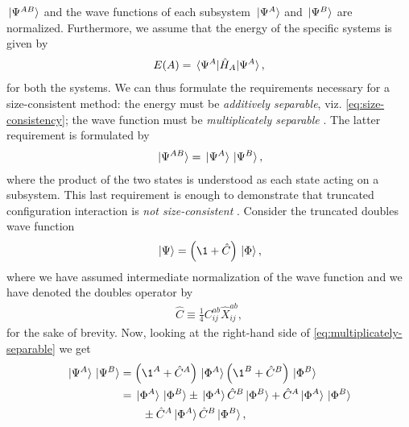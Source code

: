             $\ket*{\Psi^{AB}}$ and the wave functions of each subsystem
            $\ket*{\Psi^{A}}$ and $\ket*{\Psi^{B}}$ are normalized.
            Furthermore, we assume that the energy of the specific systems is
            given by
            \begin{align}
                E(A) = \mel*{\Psi^{A}}{\hat{H}_{A}}{\Psi^{A}},
            \end{align}
            for both the systems.
            We can thus formulate the requirements necessary for a
            size-consistent method: the energy must be \emph{additively
            separable}, viz. \autoref{eq:size-consistency}; the wave function
            must be \emph{multiplicately separable} \cite{helgaker-molecular}.
            The latter requirement is formulated by
            \begin{align}
                \ket*{\Psi^{AB}}
                = \ket*{\Psi^{A}}\ket*{\Psi^{B}},
                \label{eq:multiplicately-separable}
            \end{align}
            where the product of the two states is understood as each state
            acting on a subsystem.
            This last requirement is enough to demonstrate that truncated
            configuration interaction is \emph{not size-consistent}
            \cite{helgaker-molecular}.
            Consider the truncated doubles wave function
            \begin{align}
                \ket*{\Psi} = \para{\1 + \hat{C}}\ket*{\slat},
            \end{align}
            where we have assumed intermediate normalization of the wave function
            and we have denoted the doubles operator by
            \begin{align}
                \hat{C} \equiv \frac{1}{4}C^{ab}_{ij}\hat{X}^{ab}_{ij},
            \end{align}
            for the sake of brevity.
            Now, looking at the right-hand side of
            \autoref{eq:multiplicately-separable} we get
            \begin{align}
                \ket*{\Psi^{A}}\ket*{\Psi^{B}}
                &= \para{\1^{A} + \hat{C}^{A}}\ket*{\slat^A}
                \para{\1^{B} + \hat{C}^{B}}\ket*{\slat^B}
                \\
                &=
                \ket*{\slat^{A}}\ket*{\slat^{B}}
                \pm \ket*{\slat^{A}}\hat{C}^{B}\ket*{\slat^{B}}
                + \hat{C}^{A}\ket*{\slat^{A}}\ket*{\slat^{B}}
                \nonumber \\
                &\qquad
                \pm \hat{C}^{A}\ket*{\slat^{A}}\hat{C}^{B}\ket*{\slat^{B}},
            \end{align}

